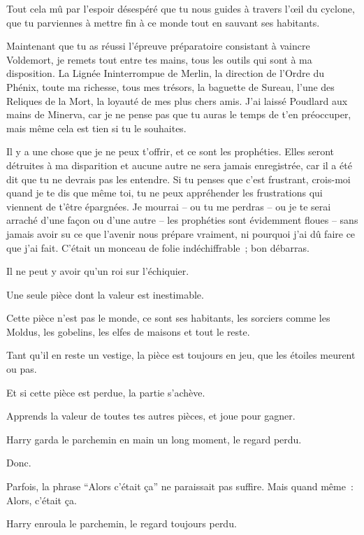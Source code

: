 \begin{writtenNote}
Tout cela mû par l'espoir désespéré que tu nous guides à travers l'œil du cyclone, que tu parviennes à mettre fin à ce monde tout en sauvant ses habitants.

Maintenant que tu as réussi l'épreuve préparatoire consistant à vaincre Voldemort, je remets tout entre tes mains, tous les outils qui sont à ma disposition. La Lignée Ininterrompue de Merlin, la direction de l'Ordre du Phénix, toute ma richesse, tous mes trésors, la baguette de Sureau, l'une des Reliques de la Mort, la loyauté de mes plus chers amis. J'ai laissé Poudlard aux mains de Minerva, car je ne pense pas que tu auras le temps de t'en préoccuper, mais même cela est tien si tu le souhaites.

Il y a une chose que je ne peux t'offrir, et ce sont les prophéties. Elles seront détruites à ma disparition et aucune autre ne sera jamais enregistrée, car il a été dit que tu ne devrais pas les entendre. Si tu penses que c'est frustrant, crois-moi quand je te dis que même toi, tu ne peux appréhender les frustrations qui viennent de t'être épargnées. Je mourrai -- ou tu me perdras -- ou je te serai arraché d'une façon ou d'une autre -- les prophéties sont évidemment floues -- sans jamais avoir su ce que l'avenir nous prépare vraiment, ni pourquoi j'ai dû faire ce que j'ai fait. C'était un monceau de folie indéchiffrable~; bon débarras.

Il ne peut y avoir qu'un roi sur l'échiquier.

Une seule pièce dont la valeur est inestimable.

Cette pièce n'est pas le monde, ce sont ses habitants, les sorciers comme les Moldus, les gobelins, les elfes de maisons et tout le reste.

Tant qu'il en reste un vestige, la pièce est toujours en jeu, que les étoiles meurent ou pas.

Et si cette pièce est perdue, la partie s'achève.

Apprends la valeur de toutes tes autres pièces, et joue pour gagner.

\end{writtenNote}

\later

Harry garda le parchemin en main un long moment, le regard perdu.

Donc.

Parfois, la phrase “Alors c'était ça” ne paraissait pas suffire. Mais quand même~: Alors, c'était ça.

Harry enroula le parchemin, le regard toujours perdu.

